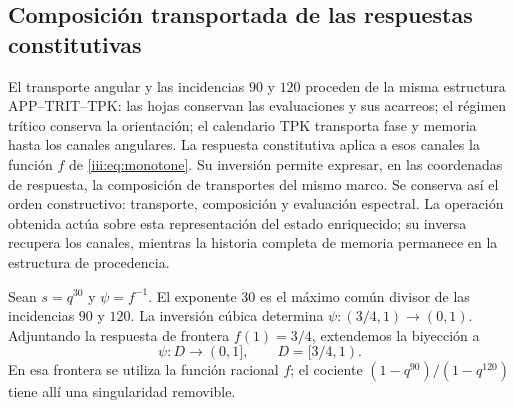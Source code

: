 \subsection{Composición transportada de las respuestas constitutivas}
\label{amp-comp-sec}

El transporte angular y las incidencias $90$ y $120$ proceden de la
misma estructura APP--TRIT--TPK: las hojas conservan las evaluaciones y
sus acarreos; el régimen trítico conserva la orientación; el calendario
TPK transporta fase y memoria hasta los canales angulares. La respuesta
constitutiva aplica a esos canales la función $f$ de
\eqref{iii:eq:monotone}. Su inversión permite expresar, en las coordenadas
de respuesta, la composición de transportes del mismo marco. Se conserva
así el orden constructivo: transporte, composición y evaluación espectral.
La operación obtenida actúa sobre esta representación del estado enriquecido;
su inversa recupera los canales, mientras la historia completa de memoria
permanece en la estructura de procedencia.

Sean $s=q^{30}$ y $\psi=f^{-1}$. El exponente $30$ es el máximo común
divisor de las incidencias $90$ y $120$. La inversión cúbica determina
$\psi:(3/4,1)\longrightarrow(0,1)$. Adjuntando la respuesta de frontera
$f(1)=3/4$, extendemos la biyección a
\[
 \psi:D\longrightarrow(0,1],\qquad D=[3/4,1).
\]
En esa frontera se utiliza la función racional $f$; el cociente
$(1-q^{90})/(1-q^{120})$ tiene allí una singularidad removible.

